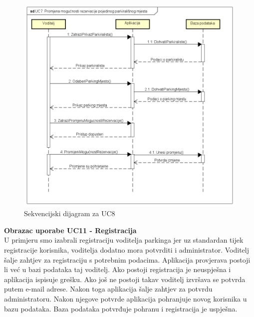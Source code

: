 \begin{packed_item}
				\begin{figure}[H]
					\includegraphics[width=\textwidth]{slike/PromjenaMogucnostiRezer.png} %
					\caption{Sekvencijski dijagram za UC8}
					\label{fig:mogucnostRezerv}
				\end{figure}
				\eject	
				
				
				\textbf{Obrazac uporabe UC11 - Registracija}\\
				
				U primjeru smo izabrali registraciju voditelja parkinga jer uz standardan tijek registracije korisnika, voditelja dodatno mora potvrditi i administrator. Voditelj šalje zahtjev za registraciju s potrebnim podacima. Aplikacija provjerava postoji li već u bazi podataka taj voditelj. Ako postoji registracija je neuspješna i aplikacija ispisuje grešku. Ako još ne postoji takav voditelj izvršava se potvrda putem e-mail adrese. Nakon toga aplikacija šalje zahtjev za potvrdu administratoru. Nakon njegove potvrde aplikacija pohranjuje novog korisnika u bazu podataka. Baza podataka potvrđuje pohranu i registracija je uspješna.
				\eject	
				

\end{packed_item}
